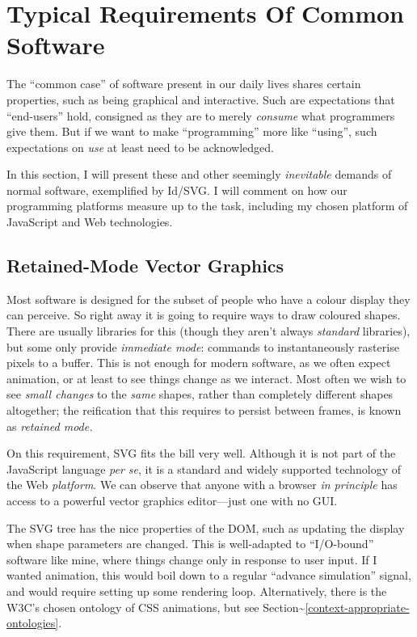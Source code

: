 \hypertarget{typical-requirements-of-common-software}{%
\section{Typical Requirements Of Common
Software}\label{typical-requirements-of-common-software}}

The ``common case'' of software present in our daily lives shares
certain properties, such as being graphical and interactive. Such are
expectations that ``end-users'' hold, consigned as they are to merely
\emph{consume} what programmers give them. But if we want to make
``programming'' more like ``using'', such expectations on \emph{use} at
least need to be acknowledged.

In this section, I will present these and other seemingly
\emph{inevitable} demands of normal software, exemplified by Id{}/SVG. I
will comment on how our programming platforms measure up to the task,
including my chosen platform of JavaScript and Web technologies.

\hypertarget{retained-mode-vector-graphics}{%
\subsection{Retained-Mode Vector
Graphics}\label{retained-mode-vector-graphics}}

Most software is designed for the subset of people who have a colour
display they can perceive. So right away it is going to require ways to
draw coloured shapes. There are usually libraries for this (though they
aren't always \emph{standard} libraries), but some only provide
\emph{immediate mode}: commands to instantaneously rasterise pixels to a
buffer. This is not enough for modern software, as we often expect
animation, or at least to see things change as we interact. Most often
we wish to see \emph{small changes} to the \emph{same} shapes, rather
than completely different shapes altogether; the reification that this
requires to persist between frames, is known as \emph{retained mode.}

On this requirement, SVG fits the bill very well. Although it is not
part of the JavaScript language \emph{per se}, it is a standard and
widely supported technology of the Web \emph{platform}. We can observe
that anyone with a browser \emph{in principle} has access to a powerful
vector graphics editor---just one with no GUI.

The SVG tree has the nice properties of the DOM, such as updating the
display when shape parameters are changed. This is well-adapted to
``I/O-bound'' software like mine, where things change only in response
to user input. If I wanted animation, this would boil down to a regular
``advance simulation'' signal, and would require setting up some
rendering loop. Alternatively, there is the W3C's chosen ontology of CSS
animations, but see
Section\textasciitilde{}\ref{context-appropriate-ontologies}.

